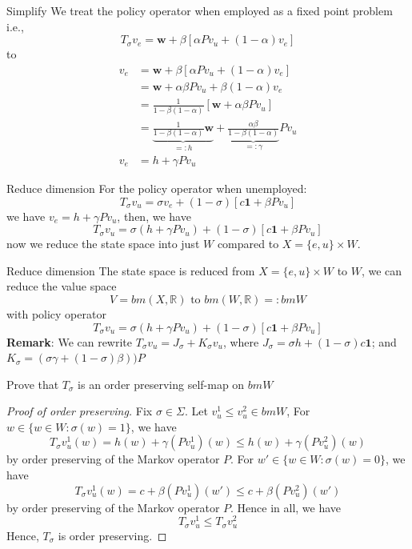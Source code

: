 \documentclass[aspectratio=169]{beamer} %
\begin{document}
\begin{frame}{Simplify}
    We treat the policy operator when employed as a fixed point problem i.e.,
    $$
    T_\sigma v_e= \mathbf{w}+\beta\left[\alpha Pv_u + (1-\alpha) v_e\right]
    $$
    to
    \begin{align*}
        v_e &= \mathbf{w}+\beta\left[\alpha Pv_u + (1-\alpha) v_e\right]\\
        &= \mathbf{w} + \alpha\beta Pv_u + \beta(1-\alpha) v_e\\
        &= \frac{1}{1-\beta(1-\alpha)}[\mathbf{w}+ \alpha\beta Pv_u]\\
        &= \underbrace{\frac{1}{1-\beta(1-\alpha)}\mathbf{w}}_{=:h} + \underbrace{\frac{\alpha\beta}{1-\beta(1-\alpha)}}_{=:\gamma}Pv_u\\
        v_e&= h+ \gamma Pv_u\tag{a relation between $v_e$ and $v_u$}
    \end{align*}
\end{frame}
\begin{frame}{Reduce dimension}
For the policy operator when unemployed:
    $$
    T_\sigma v_u = \sigma v_e + (1-\sigma)\left[c\mathbf{1}+\beta Pv_u\right]
    $$
    we have $v_e = h + \gamma P v_u$, then, we have
    $$
    T_\sigma v_u = \sigma(h+\gamma Pv_u) + (1-\sigma) [c\mathbf{1} + \beta P v_u]
    $$
    now we reduce the state space into just $W$ compared to $X= \{e,u\}\times W$.
\end{frame}
\begin{frame}{Reduce dimension}
The state space is reduced from $X=\{e,u\}\times W$ to $W$, we can reduce the value space
$$
V = bm(X,\mathbb{R}) \text{  to  $bm(W,\mathbb{R})=: bmW$}
$$
with policy operator
$$
T_\sigma v_u = \sigma(h+\gamma Pv_u) + (1-\sigma) [c\mathbf{1} + \beta P v_u]
$$
\textbf{Remark}: We can rewrite $T_\sigma v_u = J_\sigma + K_\sigma v_u$, where $J_\sigma  = \sigma h + (1-\sigma)c\mathbf{1}$; and $K_\sigma  = (\sigma \gamma +(1-\sigma) \beta))P$
\end{frame}

\begin{frame}{Prove that $T_\sigma$ is an order preserving self-map on $bmW$}
\begin{proof}[Proof of order preserving]
Fix $\sigma\in\Sigma$. Let $v_u^1\le v_u^2\in bmW$, For $w\in \{w\in W: \sigma(w) =1\}$, we have
$$
T_\sigma v_u^1(w) = h(w)+\gamma (Pv_u^1)(w) \le h(w) + \gamma (Pv_u^2)(w)
$$
by order preserving of the Markov operator $P$. For $w'\in \{w\in W: \sigma(w)=0\}$, we have
$$
T_\sigma v_u^1(w) = c + \beta (Pv_u^1)(w')\le c+\beta(Pv_u^2)(w')
$$
by order preserving of the Markov operator $P$. Hence in all, we have
$$
T_\sigma v_u^1\le T_\sigma v_u^2
$$
Hence, $T_\sigma$ is order preserving.
\end{proof}
    
\end{frame}
\end{document}
